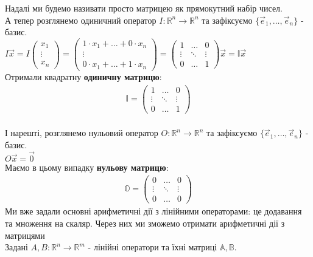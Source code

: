 \documentclass[a4paper, 10pt]{article}
\theoremstyle{theoremdd}
\theoremstyle{theoremdd}
\theoremstyle{theoremdd}
\theoremstyle{theoremdd}
\theoremstyle{theoremdd}
\theoremstyle{theoremdd}
\theoremstyle{theoremdd}
\theoremstyle{theoremdd}
\begin{document}
	Надалі ми будемо називати просто матрицею як прямокутний набір чисел.
	\bigskip \\
	А тепер розглянемо одиничний оператор $I: \mathbb{R}^n \to \mathbb{R}^n$ та зафіксуємо $\{\vec{e}_1, \dots, \vec{e}_n\}$ - базис.\\
	$I \vec{x} = I \begin{pmatrix}
	x_1 \\ \vdots \\ x_n
	\end{pmatrix} = \begin{pmatrix}
	1 \cdot x_1 + \dots + 0 \cdot x_n \\ \vdots \\ 0 \cdot x_1 + \dots + 1 \cdot x_n
	\end{pmatrix} = \begin{pmatrix}
	1 & \dots & 0 \\
	\vdots & \ddots & \vdots \\
	0 & \dots & 1
	\end{pmatrix} \vec{x} = \mathbb{I} \vec{x}$
	\bigskip \\
	Отримали квадратну \textbf{одиничну матрицю}:
	\begin{align*}
	\mathbb{I} = \begin{pmatrix}
	1 & \dots & 0 \\
	\vdots & \ddots & \vdots \\
	0 & \dots & 1
	\end{pmatrix}
	\end{align*}
	\bigskip \\
	І нарешті, розглянемо нульовий оператор $O: \mathbb{R}^n \to \mathbb{R}^n$ та зафіксуємо $\{\vec{e}_1, \dots, \vec{e}_n\}$ - базис.\\
	$O \vec{x} = \vec{0}$\\
	Маємо в цьому випадку \textbf{нульову матрицю}:
	\begin{align*}
	\mathbb{O} = \begin{pmatrix}
	0 & \dots & 0 \\
	\vdots & \ddots & \vdots \\
	0 & \dots & 0
	\end{pmatrix}
	\end{align*}
	Ми вже задали основні арифметичні дії з лінійними операторами: це додавання та множення на скаляр. Через них ми зможемо отримати арифметичні дії з матрицями\\
	Задані $A,B: \mathbb{R}^n \to \mathbb{R}^m$ - лінійні оператори та їхні матриці $\mathbb{A}, \mathbb{B}$.\\
\end{document}
